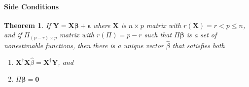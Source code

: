\documentclass{article}
\newtheorem{theorem}{Theorem}
\begin{document}
\bigskip

\paragraph{Side Conditions}

\begin{theorem}
If $\mathbf{Y}=\mathbf{X\beta +\epsilon }$ where $\mathbf{X}$ is $n\times p$
matrix with $r\left( \mathbf{X}\right) =r<p\leq n$, and if $\Pi _{\left(
p-r\right) \times p}$ matrix with $r\left( \Pi \right) =p-r$ such that $\Pi 
\mathbf{\beta }$ is a set of nonestimable functions, then there is a unique
vector $\hat{\beta}$ that satisfies both

\begin{enumerate}
\item $\mathbf{X}^{\dagger }\mathbf{X}\hat{\beta}=\mathbf{X^{\dagger }Y}$,
and

\item $\Pi \mathbf{\beta =0}$
\end{enumerate}
\end{theorem}

\bigskip
\end{document}

